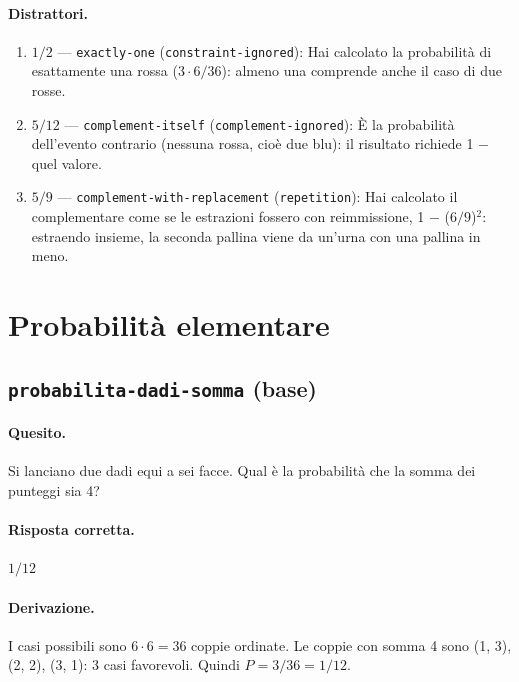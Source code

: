 \paragraph{Distrattori.}
\begin{enumerate}
  \item $1/2$ --- \texttt{exactly-one} (\texttt{constraint-ignored}): Hai calcolato la probabilità di esattamente una rossa ($3\cdot 6/36$): \guillemotleft{}almeno una\guillemotright{} comprende anche il caso di due rosse.
  \item $5/12$ --- \texttt{complement-itself} (\texttt{complement-ignored}): È la probabilità dell'evento contrario (nessuna rossa, cioè due blu): il risultato richiede 1 $-$ quel valore.
  \item $5/9$ --- \texttt{complement-with-replacement} (\texttt{repetition}): Hai calcolato il complementare come se le estrazioni fossero con reimmissione, 1 $-$ ($6/9$)$^{2}$: estraendo insieme, la seconda pallina viene da un'urna con una pallina in meno.
\end{enumerate}

\section{Probabilità elementare}

\subsection{\texorpdfstring{\texttt{probabilita-dadi-somma} (base)}{probabilita-dadi-somma (base)}}

\paragraph{Quesito.} Si lanciano due dadi equi a sei facce. Qual è la probabilità che la somma dei punteggi sia 4?

\paragraph{Risposta corretta.} $1/12$

\paragraph{Derivazione.} I casi possibili sono $6 \cdot  6 = 36$ coppie ordinate. Le coppie con somma 4 sono (1, 3), (2, 2), (3, 1): 3 casi favorevoli. Quindi $P = 3/36 = 1/12$.

